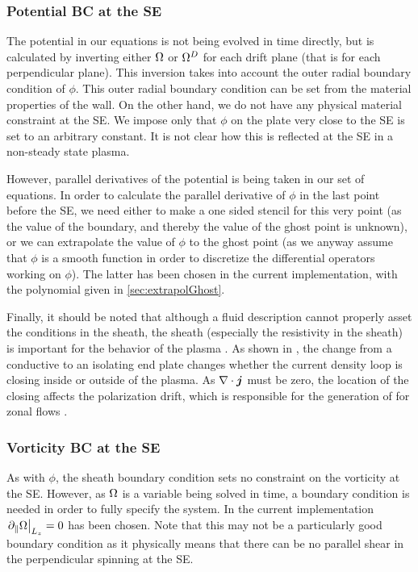 \subsubsection{Potential BC at the SE}
%
The potential in our equations is not being evolved in time directly, but is calculated by inverting either $\Omega$ or $\Omega^D$ for each drift plane (that is for each perpendicular plane).
This inversion takes into account the outer radial boundary condition of $\phi$.
This outer radial boundary condition can be set from the material properties of the wall.
On the other hand, we do not have any physical material constraint at the SE.
We impose only that $\phi$ on the plate very close to the SE is set to an arbitrary constant.
It is not clear how this is reflected at the SE in a non-steady state plasma.

However, parallel derivatives of the potential is being taken in our set of equations.
In order to calculate the parallel derivative of $\phi$ in the last point before the SE, we need either to make a one sided stencil for this very point (as the value of the boundary, and thereby the value of the ghost point is unknown), or we can extrapolate the value of $\phi$ to the ghost point (as we anyway assume that $\phi$ is a smooth function in order to discretize the differential operators working on $\phi$).
The latter has been chosen in the current implementation, with the polynomial given in \cref{sec:extrapolGhost}.

Finally, it should be noted that although a fluid description cannot properly asset the conditions in the sheath, the sheath (especially the resistivity in the sheath) is important for the behavior of the plasma \cite{Oldenburger2012,Yamada2014}.
As shown in \cite{ChakrabortyThakur2013}, the change from a conductive to an isolating end plate changes whether the current density loop is closing inside or outside of the plasma. As $\nabla\cdot \boldsymbol{j}$ must be zero, the location of the closing affects the polarization drift, which is responsible for the generation of for  zonal flows \cite{Diamond1991}.

\subsubsection{Vorticity BC at the SE}
%
As with $\phi$, the sheath boundary condition sets no constraint on the vorticity at the SE.
However, as $\Omega$ is a variable being solved in time, a boundary condition is needed in order to fully specify the system.
In the current implementation $\left. \partial_\| \Omega \right|_{L_z} = 0$ has been chosen.
Note that this may not be a particularly good boundary condition as it physically means that there can be no parallel shear in the perpendicular spinning at the SE.

